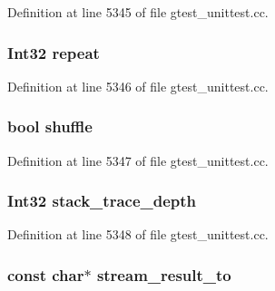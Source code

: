 \-Definition at line 5345 of file gtest\-\_\-unittest.\-cc.

\hypertarget{structtesting_1_1Flags_af605e37f40178778020faf803094b25d}{
\subsubsection[{repeat}]{\setlength{\rightskip}{0pt plus 5cm}\-Int32 {\bf repeat}}}\label{d6/d20/structtesting_1_1Flags_af605e37f40178778020faf803094b25d}


\-Definition at line 5346 of file gtest\-\_\-unittest.\-cc.

\hypertarget{structtesting_1_1Flags_a6e3f5f03c7b0b6a6153e16d38f2ab04d}{
\subsubsection[{shuffle}]{\setlength{\rightskip}{0pt plus 5cm}bool {\bf shuffle}}}\label{d6/d20/structtesting_1_1Flags_a6e3f5f03c7b0b6a6153e16d38f2ab04d}


\-Definition at line 5347 of file gtest\-\_\-unittest.\-cc.

\hypertarget{structtesting_1_1Flags_a153584a7bc86c558b8e22e5bbc9bfc31}{
\subsubsection[{stack\-\_\-trace\-\_\-depth}]{\setlength{\rightskip}{0pt plus 5cm}\-Int32 {\bf stack\-\_\-trace\-\_\-depth}}}\label{d6/d20/structtesting_1_1Flags_a153584a7bc86c558b8e22e5bbc9bfc31}


\-Definition at line 5348 of file gtest\-\_\-unittest.\-cc.

\hypertarget{structtesting_1_1Flags_aeeca9cdf2aff763dc87db480033768a7}{
\subsubsection[{stream\-\_\-result\-\_\-to}]{\setlength{\rightskip}{0pt plus 5cm}const char$\ast$ {\bf stream\-\_\-result\-\_\-to}}}\label{d6/d20/structtesting_1_1Flags_aeeca9cdf2aff763dc87db480033768a7}


